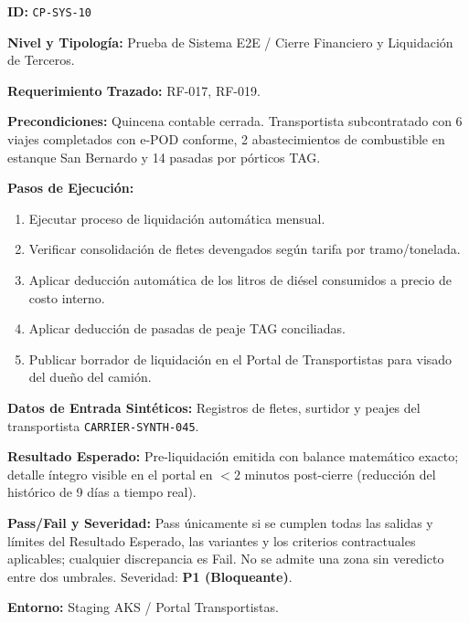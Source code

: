 \par\noindent\textbf{ID:} \texttt{C\allowbreak{}P\allowbreak{}-\allowbreak{}S\allowbreak{}Y\allowbreak{}S\allowbreak{}-\allowbreak{}1\allowbreak{}0\allowbreak{}}\par
\par\noindent\textbf{Nivel y Tipología:} Prueba de Sistema E2E / Cierre Financiero y Liquidación de Terceros.\par
\par\noindent\textbf{Requerimiento Trazado:} RF-017, RF-019.\par
\par\noindent\textbf{Precondiciones:} Quincena contable cerrada. Transportista subcontratado con 6 viajes completados con e-POD conforme, 2 abastecimientos de combustible en estanque San Bernardo y 14 pasadas por pórticos TAG.\par
\par\noindent\textbf{Pasos de Ejecución:} \par
\begin{enumerate}
\item Ejecutar proceso de liquidación automática mensual.
\item Verificar consolidación de fletes devengados según tarifa por tramo/tonelada.
\item Aplicar deducción automática de los litros de diésel consumidos a precio de costo interno.
\item Aplicar deducción de pasadas de peaje TAG conciliadas.
\item Publicar borrador de liquidación en el Portal de Transportistas para visado del dueño del camión.
\end{enumerate}
\par\noindent\textbf{Datos de Entrada Sintéticos:} Registros de fletes, surtidor y peajes del transportista \texttt{C\allowbreak{}A\allowbreak{}R\allowbreak{}R\allowbreak{}I\allowbreak{}E\allowbreak{}R\allowbreak{}-\allowbreak{}S\allowbreak{}Y\allowbreak{}N\allowbreak{}T\allowbreak{}H\allowbreak{}-\allowbreak{}0\allowbreak{}4\allowbreak{}5\allowbreak{}}.\par
\par\noindent\textbf{Resultado Esperado:} Pre-liquidación emitida con balance matemático exacto; detalle íntegro visible en el portal en \(< 2\text{ minutos}\) post-cierre (reducción del histórico de 9 días a tiempo real).\par
\par\noindent\textbf{Pass/Fail y Severidad:} Pass únicamente si se cumplen todas las salidas y límites del Resultado Esperado, las variantes y los criterios contractuales aplicables; cualquier discrepancia es Fail. No se admite una zona sin veredicto entre dos umbrales. Severidad: \textbf{P1 (Bloqueante)}.\par
\par\noindent\textbf{Entorno:} Staging AKS / Portal Transportistas.\par







